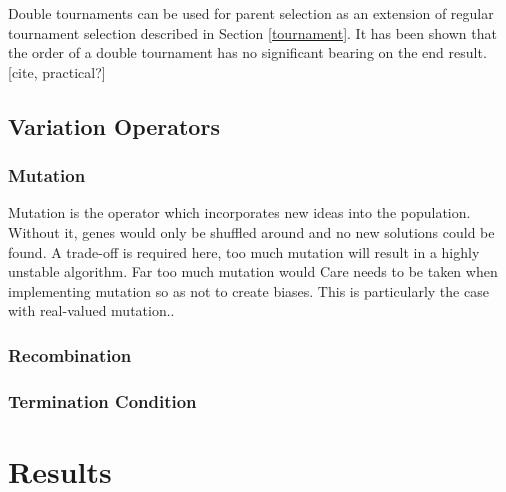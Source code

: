 \documentclass{article}
\begin{document}
\cite{parsimony_pressure}

Double tournaments can be used for parent selection as an extension of regular tournament selection described in Section \ref{tournament}.
It has been shown that the order of a double tournament has no significant bearing on the end result. [cite, practical?]

\cite{multi_objective_bloat}


\subsection{Variation Operators}
\subsubsection{Mutation}
Mutation is the operator which incorporates new ideas into the population. Without it, genes would only be shuffled around and no new solutions could be found. %
A trade-off is required here, too much mutation will result in a highly unstable algorithm. Far too much mutation would %
Care needs to be taken when implementing mutation so as not to create biases. This is particularly the case with real-valued mutation.. %

\subsubsection{Recombination}


\subsubsection{Termination Condition}

\section{Results} %
\end{document}

